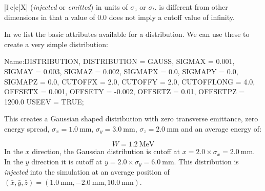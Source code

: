 \begin{table}[!htb]
\begin{center}
\begin{tabularx}{\textwidth-1cm}{|l|c|c|X|}
{      (\emph{injected} or \emph{emitted}) in units of $\sigma_{z}$ or $\sigma_{t}$.  is
      different from other dimensions in that a value of \num{0.0} does not imply a cutoff value of infinity.}
      \hline
    \end{tabularx}
  \end{center}
\end{table}

In  we list the basic attributes available for a  distribution. We
can use these to create a very simple  distribution:

\begin{example}
Name:DISTRIBUTION, DISTRIBUTION = GAUSS,
                   SIGMAX = 0.001,
                   SIGMAY = 0.003,
                   SIGMAZ = 0.002,
                   SIGMAPX = 0.0,
                   SIGMAPY = 0.0,
                   SIGMAPZ = 0.0,
                   CUTOFFX = 2.0,
                   CUTOFFY = 2.0,
                   CUTOFFLONG = 4.0,
                   OFFSETX = 0.001,
                   OFFSETY = -0.002,
                   OFFSETZ = 0.01,
                   OFFSETPZ = 1200.0
                   USEEV = TRUE;
\end{example}
This creates a Gaussian shaped distribution with zero transverse emittance, zero energy spread, $\sigma_{x} = \SI{1.0}{\milli\meter}$,
$\sigma_{y} = \SI{3.0}{\milli\meter}$, $\sigma_{z} = \SI{2.0}{\milli\meter}$ and an average energy of:

\begin{equation*}
W = \SI{1.2}{\mega\electronvolt}
\end{equation*}
In the $x$ direction, the Gaussian distribution is cutoff at $x = 2.0 \times \sigma_{x} = \SI{2.0}{\milli\meter}$. In the $y$
direction it is cutoff at $y = 2.0 \times \sigma_{y} = \SI{6.0}{\milli\meter}$. This distribution is \emph{injected} into the simulation
at an average position of $(\bar{x},\bar{y},\bar{z})=(\SI{1.0}{\milli\meter}, \SI{-2.0}{\milli\meter}, \SI{10.0}{\milli\meter})$.



